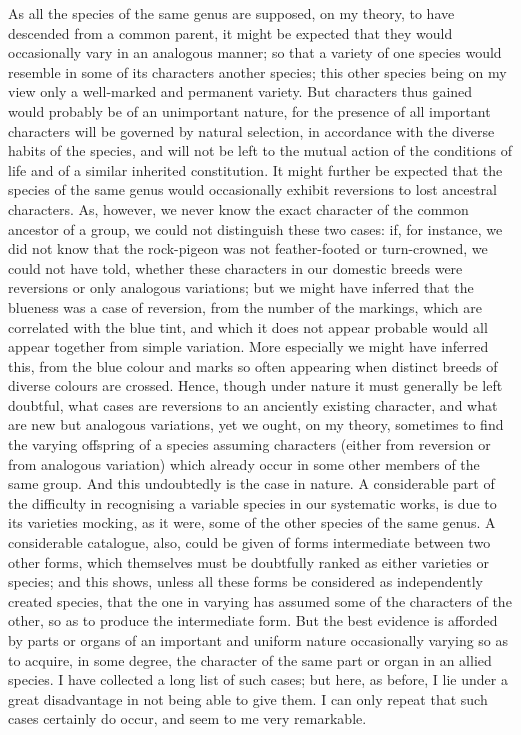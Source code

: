 As all the species of the same genus are supposed, on my theory, to have descended from a common parent, it might be expected that they would occasionally vary in an analogous manner; so that a variety of one species would resemble in some of its characters another species; this other species being on my view only a well-marked and permanent variety. But characters thus gained would probably be of an unimportant nature, for the presence of all important characters will be governed by natural selection, in accordance with the diverse habits of the species, and will not be left to the mutual action of the conditions of life and of a similar inherited constitution. It might further be expected that the species of the same genus would occasionally exhibit reversions to lost ancestral characters. As, however, we never know the exact character of the common ancestor of a group, we could not distinguish these two cases: if, for instance, we did not know that the rock-pigeon was not feather-footed or turn-crowned, we could not have told, whether these characters in our domestic breeds were reversions or only analogous variations; but we might have inferred that the blueness was a case of reversion, from the number of the markings, which are correlated with the blue tint, and which it does not appear probable would all appear together from simple variation. More especially we might have inferred this, from the blue colour and marks so often appearing when distinct breeds of diverse colours are crossed. Hence, though under nature it must generally be left doubtful, what cases are reversions to an anciently existing character, and what are new but analogous variations, yet we ought, on my theory, sometimes to find the varying offspring of a species assuming characters (either from reversion or from analogous variation) which already occur in some other members of the same group. And this undoubtedly is the case in nature.
A considerable part of the difficulty in recognising a variable species in our systematic works, is due to its varieties mocking, as it were, some of the other species of the same genus. A considerable catalogue, also, could be given of forms intermediate between two other forms, which themselves must be doubtfully ranked as either varieties or species; and this shows, unless all these forms be considered as independently created species, that the one in varying has assumed some of the characters of the other, so as to produce the intermediate form. But the best evidence is afforded by parts or organs of an important and uniform nature occasionally varying so as to acquire, in some degree, the character of the same part or organ in an allied species. I have collected a long list of such cases; but here, as before, I lie under a great disadvantage in not being able to give them. I can only repeat that such cases certainly do occur, and seem to me very remarkable.
